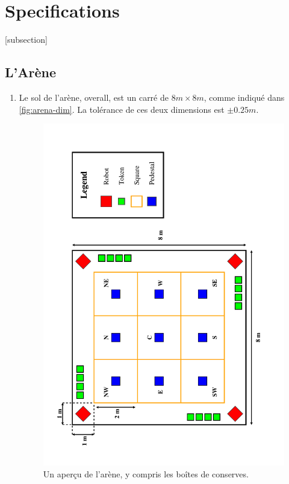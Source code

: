 \section{Specifications}
\label{sec:Specifications}

[subsection]
\newcommand{\rcnii}{\stepcounter{rulei}\arabic{section}.\arabic{subsection}.\arabic{rulei}}
\renewcommand{\labelenumi}{\rcnii}

\subsection{L'Arène}
\label{sub:arena}
\begin{enumerate}
\item Le sol de l'arène, overall, est un carré de $8m \times 8m$, comme indiqué dans \autoref{fig:arena-dim}.
 La tolérance de ces deux dimensions est $\pm0.25m$.

\begin{figure}
  \includegraphics[keepaspectratio, clip, width=\textwidth]{./images/arena.pdf}
  \caption{\label{fig:arena-dim}Un aperçu de l'arène, y compris les boîtes de conserves.}
\end{figure}


\end{enumerate}
